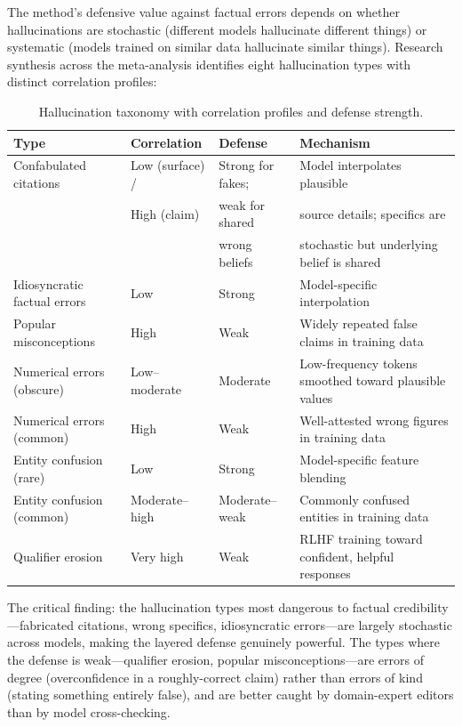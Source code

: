 \documentclass[11pt,letterpaper]{article}
\begin{document}
The method's defensive value against factual errors depends on whether hallucinations are stochastic (different models hallucinate different things) or systematic (models trained on similar data hallucinate similar things). Research synthesis across the meta-analysis identifies eight hallucination types with distinct correlation profiles:

\begin{table}[ht]
\centering
\caption{Hallucination taxonomy with correlation profiles and defense strength.}
\label{tab:hallucination-taxonomy}
\small
\begin{tabular}{@{}lllp{4.5cm}@{}}
\toprule
\textbf{Type} & \textbf{Correlation} & \textbf{Defense} & \textbf{Mechanism} \\
\midrule
Confabulated citations & Low (surface) / & Strong for fakes; & Model interpolates plausible \\
 & High (claim) & weak for shared & source details; specifics are \\
 & & wrong beliefs & stochastic but underlying belief is shared \\
\addlinespace
Idiosyncratic factual errors & Low & Strong & Model-specific interpolation \\
\addlinespace
Popular misconceptions & High & Weak & Widely repeated false claims in training data \\
\addlinespace
Numerical errors (obscure) & Low--moderate & Moderate & Low-frequency tokens smoothed toward plausible values \\
\addlinespace
Numerical errors (common) & High & Weak & Well-attested wrong figures in training data \\
\addlinespace
Entity confusion (rare) & Low & Strong & Model-specific feature blending \\
\addlinespace
Entity confusion (common) & Moderate--high & Moderate--weak & Commonly confused entities in training data \\
\addlinespace
Qualifier erosion & Very high & Weak & RLHF training toward confident, helpful responses \\
\bottomrule
\end{tabular}
\end{table}

The critical finding: the hallucination types most dangerous to factual credibility---fabricated citations, wrong specifics, idiosyncratic errors---are largely stochastic across models, making the layered defense genuinely powerful. The types where the defense is weak---qualifier erosion, popular misconceptions---are errors of degree (overconfidence in a roughly-correct claim) rather than errors of kind (stating something entirely false), and are better caught by domain-expert editors than by model cross-checking.
\end{document}
